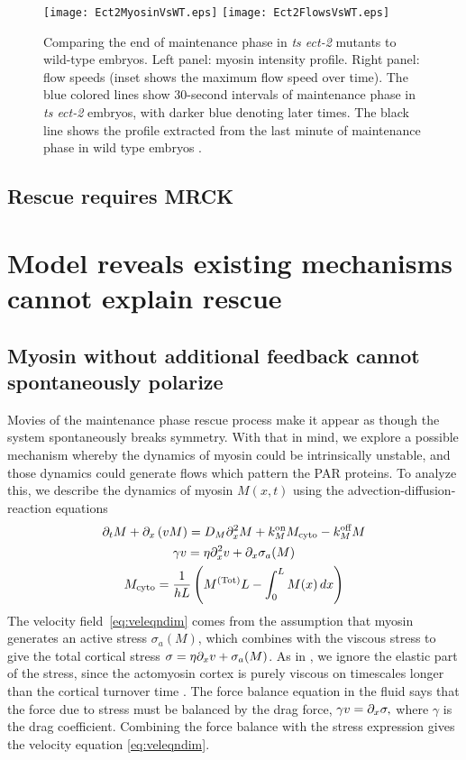 \documentclass[11pt]{article}
\newcommand{\6}[1]{#1_{\text{6}}}
\newcommand{\3}[1]{#1_{\text{3}}}
\newcommand{\Tot}[1]{#1^\text{(Tot)}}
\newcommand{\My}[1]{#1_M}
\begin{document}
\begin{figure}
\centering
\texttt{[image: Ect2MyosinVsWT.eps]}
\texttt{[image: Ect2FlowsVsWT.eps]}
\caption{\label{fig:Ect2VsWT} Comparing the end of maintenance phase in \emph{ts ect-2} mutants to wild-type embryos. Left panel: myosin intensity profile. Right panel: flow speeds (inset shows the maximum flow speed over time). The blue colored lines show 30-second intervals of maintenance phase in \emph{ts ect-2} embryos, with darker blue denoting later times. The black line shows the profile extracted from the last minute of maintenance phase in wild type embryos \cite{sailer2015dynamic}.}
\end{figure}

\subsection{Rescue requires MRCK}

\section{Model reveals existing mechanisms cannot explain rescue }

\subsection{Myosin without additional feedback cannot spontaneously polarize \label{sec:myosin}}
Movies of the maintenance phase rescue process make it appear as though the system spontaneously breaks symmetry. With that in mind, we explore a possible mechanism whereby the dynamics of myosin could be intrinsically unstable, and those dynamics could generate flows which pattern the PAR proteins. To analyze this, we describe the dynamics of myosin $M(x,t)$ using the advection-diffusion-reaction equations \cite{bois2011pattern}
\begin{subequations}
\label{eq:MyOnly}
\begin{gather}
\Dt M + \Dx \left(v M\right) = D_M \Dx^2 M +\My{\kon}M_\text{cyto} - \My{\koff} M \\
\label{eq:veleqndim}
\gamma v = \eta \Dx^2 v + \Dx \sigma_a(M)\\
M_\text{cyto} = \frac{1}{hL}\left(\Tot{M}L-\int_0^L M(x) \, dx\right)
\end{gather}
\end{subequations}
The velocity field\ \eqref{eq:veleqndim} comes from the assumption that myosin generates an active stress $\sigma_a(M)$, which combines with the viscous stress to give the total cortical stress $\sigma = \eta \partial_x{v} + \sigma_a(M)$. As in \cite{bois2011pattern}, we ignore the elastic part of the stress, since the actomyosin cortex is purely viscous on timescales longer than the cortical turnover time \cite{mayer2010anisotropies}. The force balance equation in the fluid says that the force due to stress must be balanced by the drag force, $\gamma v = \partial_x \sigma,$
where $\gamma$ is the drag coefficient. Combining the force balance with the stress expression gives the velocity equation \eqref{eq:veleqndim}.
\end{document}
